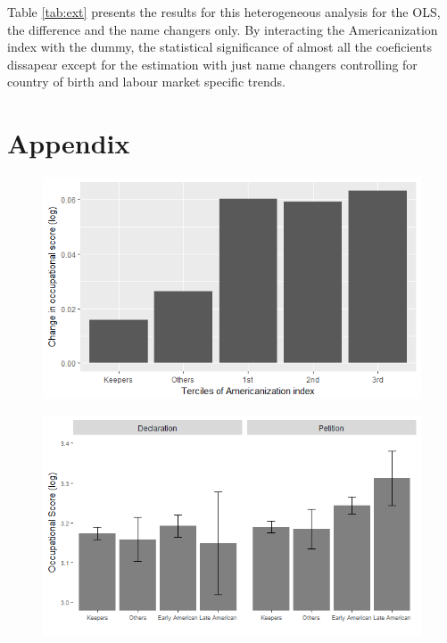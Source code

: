 \documentclass[12pt]{article}
\begin{document}
 
 \medskip
 
 Table \ref{tab:ext} presents the results for this heterogeneous analysis for the OLS, the difference and the name changers only. By interacting the Americanization index with the dummy, the statistical significance of almost all the coeficients dissapear except for the estimation with just name changers controlling for country of birth and labour market specific trends. 
 
 











\appendix
{}

\section{Appendix}


	
		
\begin{center}
	\begin{figure}[H]\caption{}\label{fig:fig1}
		\includegraphics[width=150mm]{figure1.png}
	\end{figure}
\end{center}

\begin{center}
	\begin{figure}[H]\caption{}\label{fig:fig2}
		\includegraphics[width=150mm]{figure2.png}
	\end{figure}
\end{center}
\end{document}
